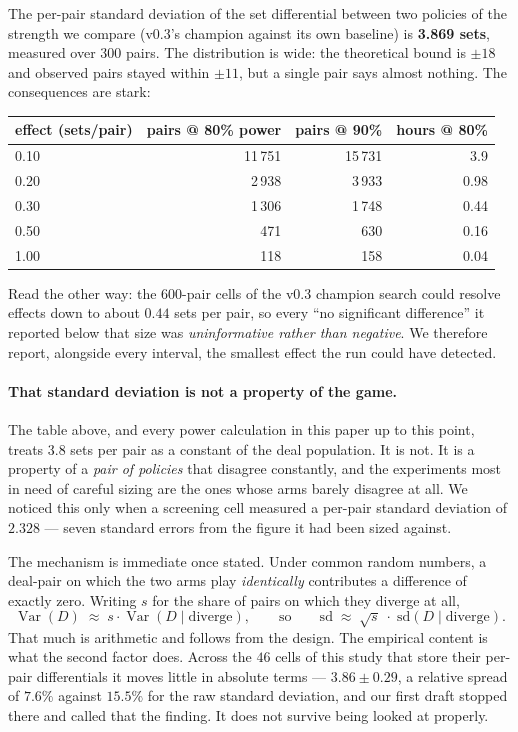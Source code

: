 \documentclass[11pt,letterpaper]{article}
\begin{document}
The per-pair standard deviation of the set differential between two policies of
the strength we compare (v0.3's champion against its own baseline) is
\textbf{3.869 sets}, measured over 300 pairs. The distribution is wide: the
theoretical bound is $\pm 18$ and observed pairs stayed within $\pm 11$, but a
single pair says almost nothing. The consequences are stark:

\begin{center}
\small
\begin{tabular}{lrrr}
\toprule
effect (sets/pair) & pairs @ 80\% power & pairs @ 90\% & hours @ 80\% \\
\midrule
0.10 & 11\,751 & 15\,731 & 3.9 \\
0.20 & 2\,938 & 3\,933 & 0.98 \\
0.30 & 1\,306 & 1\,748 & 0.44 \\
0.50 & 471 & 630 & 0.16 \\
1.00 & 118 & 158 & 0.04 \\
\bottomrule
\end{tabular}
\end{center}

Read the other way: the 600-pair cells of the v0.3 champion search could resolve
effects down to about $0.44$ sets per pair, so every ``no significant
difference'' it reported below that size was \emph{uninformative rather than
negative}. We therefore report, alongside every interval, the smallest effect
the run could have detected.

\paragraph{That standard deviation is not a property of the game.} The table
above, and every power calculation in this paper up to this point, treats
$3.8$ sets per pair as a constant of the deal population. It is not. It is a
property of a \emph{pair of policies} that disagree constantly, and the
experiments most in need of careful sizing are the ones whose arms barely
disagree at all. We noticed this only when a screening cell measured a per-pair
standard deviation of $2.328$ --- seven standard errors from the figure it had
been sized against.

The mechanism is immediate once stated. Under common random numbers, a deal-pair
on which the two arms play \emph{identically} contributes a difference of
exactly zero. Writing $s$ for the share of pairs on which they diverge at all,
\[
  \operatorname{Var}(D) \;\approx\; s \cdot \operatorname{Var}(D \mid \text{diverge}),
  \qquad\text{so}\qquad
  \mathrm{sd} \;\approx\; \sqrt{s}\;\cdot\;\mathrm{sd}(D \mid \text{diverge}).
\]
That much is arithmetic and follows from the design. The empirical content is
what the second factor does. Across the $46$ cells of this study that store
their per-pair differentials it moves little in absolute terms --- $3.86 \pm
0.29$, a relative spread of $7.6\%$ against $15.5\%$ for the raw standard
deviation, and our first draft stopped there and called that the finding. It
does not survive being looked at properly.
\end{document}
